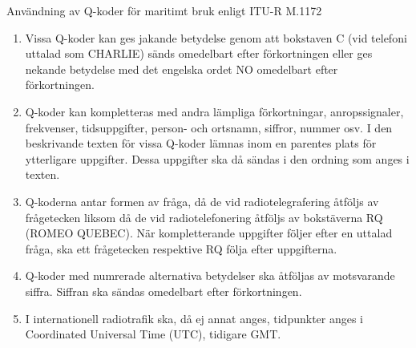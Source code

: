 Användning av Q-koder för maritimt bruk enligt ITU-R M.1172
\begin{enumerate}
	\item Vissa Q-koder kan ges jakande betydelse genom att bokstaven C
	(vid telefoni uttalad som CHARLIE) sänds omedelbart efter
	förkortningen eller ges nekande betydelse med det engelska ordet NO
	omedelbart efter förkortningen.
	\item Q-koder kan kompletteras med andra lämpliga förkortningar,
	anropssignaler, frekvenser, tidsuppgifter, person- och ortsnamn,
	siffror, nummer osv. I den beskrivande texten för vissa Q-koder
	lämnas inom en parentes plats för ytterligare uppgifter. Dessa
	uppgifter ska då sändas i den ordning som anges i texten.
	\item Q-koderna antar formen av fråga, då de vid radiotelegrafering
	åtföljs av frågetecken liksom då de vid radiotelefonering åtföljs av
	bokstäverna RQ (ROMEO QUEBEC). När kompletterande uppgifter följer
	efter en uttalad fråga, ska ett frågetecken respektive RQ följa
	efter uppgifterna.
	\item Q-koder med numrerade alternativa betydelser ska åtföljas av
	motsvarande siffra. Siffran ska sändas omedelbart efter
	förkortningen.
	\item I internationell radiotrafik ska, då ej annat anges,
	tidpunkter anges i Coordinated Universal Time (UTC), tidigare GMT.
\end{enumerate}
